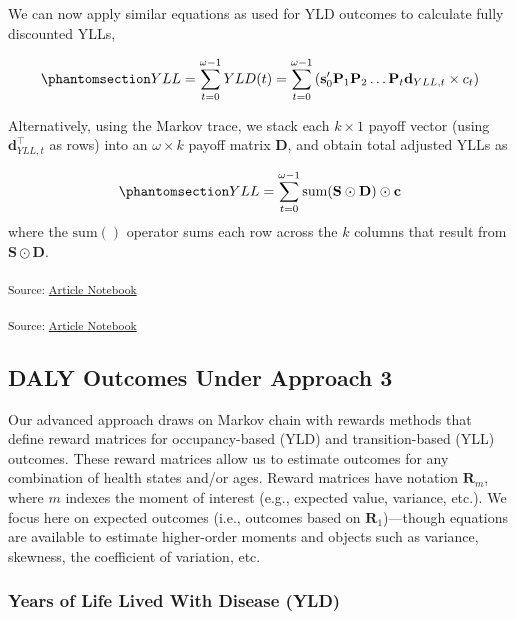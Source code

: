 \documentclass[
]{agujournal2019}
\begin{document}
We can now apply similar equations as used for YLD outcomes to calculate
fully discounted YLLs,

\begin{equation}\phantomsection\label{eq-yllcum}{
YLL=\sum_{t=0}^{\omega-1} YLD(t)=\sum_{t=0}^{\omega-1}\left(\mathbf{s}'_0 \mathbf{P}_1\mathbf{P}_2\dots\mathbf{P}_t \mathbf{d}_{YLL,t}  \times c_t \right)
}\end{equation}

Alternatively, using the Markov trace, we stack each \(k \times 1\)
payoff vector (using \(\mathbf{d}_{YLL,t}^\top\) as rows) into an
\(\omega \times k\) payoff matrix \(\mathbf{D}\), and obtain total
adjusted YLLs as

\begin{equation}\phantomsection\label{eq-ylltrace}{
YLL = \sum_{t=0}^{\omega-1} \text{sum}(\mathbf{S} \odot \mathbf{D}) \odot \mathbf{c}
}\end{equation} where the \(\text{sum}()\) operator sums each row across
the \(k\) columns that result from \(\mathbf{S} \odot \mathbf{D}\).

\textsubscript{Source:
\href{https://graveja0.github.io/dalys/index.qmd.html}{Article
Notebook}}

\textsubscript{Source:
\href{https://graveja0.github.io/dalys/index.qmd.html}{Article
Notebook}}

\subsection{DALY Outcomes Under Approach 3}\label{sec-outcomes3}

Our advanced approach draws on Markov chain with rewards methods that
define reward matrices for occupancy-based (YLD) and transition-based
(YLL) outcomes. These reward matrices allow us to estimate outcomes for
any combination of health states and/or ages. Reward matrices have
notation \(\mathbf{R}_m\), where \(m\) indexes the moment of interest
(e.g., expected value, variance, etc.). We focus here on expected
outcomes (i.e., outcomes based on \(\mathbf{R}_1\))---though equations
are available to estimate higher-order moments and objects such as
variance, skewness, the coefficient of variation, etc.

\subsubsection{Years of Life Lived With Disease
(YLD)}\label{years-of-life-lived-with-disease-yld}
\end{document}
